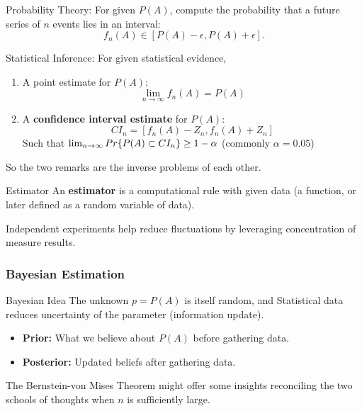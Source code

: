 \begin{rmk}{Probability Theory:} 
	For given \(P(A)\), compute the probability that a future series of \(n\) events lies in an interval:  
    \[
    f_n(A) \in [P(A) - \epsilon, P(A) + \epsilon].
    \]
\end{rmk}
\begin{rmk}{Statistical Inference:}  
For given statistical evidence, 
\begin{enumerate}
	\item A point estimate for $P(A)$: 
    	\[
   		\lim_{n\to\infty} f_n(A) = P(A)
   		\]
	\item A \textbf{confidence interval estimate} for \(P(A)\):  
    \[
   	CI_n = [f_n(A) - Z_n, f_n(A) + Z_n] 
    \]
    Such that $\lim_{n\to \infty}Pr\qty{P(A)\subset CI_n} \geq 1-\alpha$ (commonly $\alpha = 0.05$)
   
\end{enumerate}
	
\end{rmk}
So the two remarks are the inverse problems of each other. \\

\begin{df}{Estimator}
An \textbf{estimator} is a computational rule with given data (a function, or later defined as a random variable of data). 

	Independent experiments help reduce fluctuations by leveraging concentration of measure results.
\end{df}


\subsubsection{Bayesian Estimation}

\begin{thm}{Bayesian Idea}
The unknown \(p = P(A)\) is itself random, and Statistical data reduces uncertainty of the parameter (information update).
\begin{itemize}
\item \textbf{Prior:} What we believe about \(P(A)\) before gathering data.
\item \textbf{Posterior:} Updated beliefs after gathering data.
\end{itemize}
\end{thm}

The Bernstein-von Mises Theorem might offer some insights reconciling the two schools of thoughts when $n$ is sufficiently large. 

